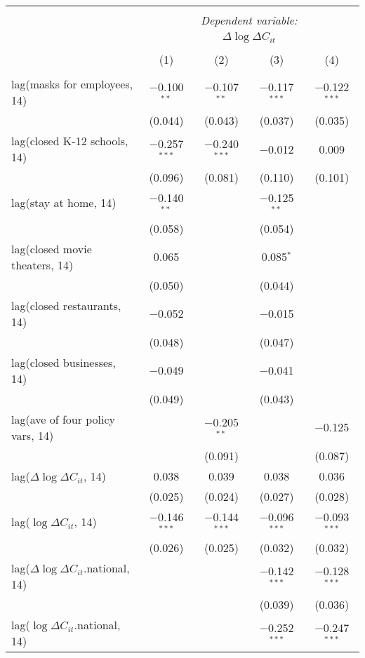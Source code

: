 \begin{tabular}{@{\extracolsep{1pt}}lcccc} 
\\[-1.8ex]\hline 
\hline \\[-1.8ex] 
 & \multicolumn{4}{c}{\textit{Dependent variable:}} \\ 
\cline{2-5} 
 & \multicolumn{4}{c}{$\Delta \log \Delta C_{it}$} \\ 
\\[-1.8ex] & (1) & (2) & (3) & (4)\\ 
\hline \\[-1.8ex] 
 lag(masks for employees, 14) & $-$0.100$^{**}$ & $-$0.107$^{**}$ & $-$0.117$^{***}$ & $-$0.122$^{***}$ \\ 
  & (0.044) & (0.043) & (0.037) & (0.035) \\ 
  lag(closed K-12 schools, 14) & $-$0.257$^{***}$ & $-$0.240$^{***}$ & $-$0.012 & 0.009 \\ 
  & (0.096) & (0.081) & (0.110) & (0.101) \\ 
  lag(stay at home, 14) & $-$0.140$^{**}$ &  & $-$0.125$^{**}$ &  \\ 
  & (0.058) &  & (0.054) &  \\ 
  lag(closed movie theaters, 14) & 0.065 &  & 0.085$^{*}$ &  \\ 
  & (0.050) &  & (0.044) &  \\ 
  lag(closed restaurants, 14) & $-$0.052 &  & $-$0.015 &  \\ 
  & (0.048) &  & (0.047) &  \\ 
  lag(closed businesses, 14) & $-$0.049 &  & $-$0.041 &  \\ 
  & (0.049) &  & (0.043) &  \\ 
  lag(ave of four policy vars, 14) &  & $-$0.205$^{**}$ &  & $-$0.125 \\ 
  &  & (0.091) &  & (0.087) \\ 
  lag($\Delta \log \Delta C_{it}$, 14) & 0.038 & 0.039 & 0.038 & 0.036 \\ 
  & (0.025) & (0.024) & (0.027) & (0.028) \\ 
  lag($\log \Delta C_{it}$, 14) & $-$0.146$^{***}$ & $-$0.144$^{***}$ & $-$0.096$^{***}$ & $-$0.093$^{***}$ \\ 
  & (0.026) & (0.025) & (0.032) & (0.032) \\ 
  lag($\Delta \log \Delta C_{it}$.national, 14) &  &  & $-$0.142$^{***}$ & $-$0.128$^{***}$ \\ 
  &  &  & (0.039) & (0.036) \\ 
  lag($\log \Delta C_{it}$.national, 14) &  &  & $-$0.252$^{***}$ & $-$0.247$^{***}$ \\ 

\end{tabular}
